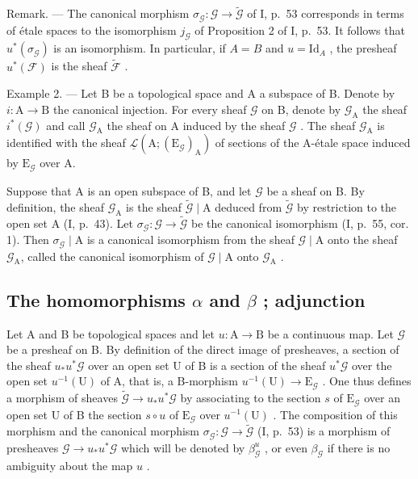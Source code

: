 Remark. --- The canonical morphism \(\sigma_{\mathcal{G}}\colon\mathcal{G}\to\widetilde{\mathcal{G}}\) of I, p.~53 corresponds in terms of étale spaces to the isomorphism \(j_{\mathcal{G}}\) of Proposition 2 of I, p.~53. It follows that \(u^{*}(\sigma_{\mathcal{G}})\) is an isomorphism. In particular, if \(A = B\) and \(u = \mathrm{Id}_A\) , the presheaf \(u^{*}(\mathcal{F})\) is the sheaf \(\widetilde{\mathcal{F}}\) .

Example 2. --- Let B be a topological space and A a subspace of B. Denote by \(i\colon\mathrm{A}\to\mathrm{B}\) the canonical injection. For every sheaf \(\mathcal{G}\) on B, denote by \(\mathcal{G}_{\mathrm{A}}\) the sheaf \(i^{*}(\mathcal{G})\) and call \(\mathcal{G}_{\mathrm{A}}\) the sheaf on A induced by the sheaf \(\mathcal{G}\) . The sheaf \(\mathcal{G}_{\mathrm{A}}\) is identified with the sheaf \(\underline{\mathcal{L}}(\mathrm{A};(\mathrm{E}_{\mathcal{G}})_{\mathrm{A}})\) of sections of the A-étale space induced by \(\mathrm{E}_{\mathcal{G}}\) over A.

Suppose that A is an open subspace of B, and let \(\mathcal{G}\) be a sheaf on B. By definition, the sheaf \(\mathcal{G}_{\mathrm{A}}\) is the sheaf \(\widetilde{\mathcal{G}}\mid \mathrm{A}\) deduced from \(\widetilde{\mathcal{G}}\) by restriction to the open set A (I, p.~43). Let \(\sigma_{\mathcal{G}}\colon \mathcal{G}\to \widetilde{\mathcal{G}}\) be the canonical isomorphism (I, p.~55, cor. 1). Then \(\sigma_{\mathcal{G}}\mid \mathrm{A}\) is a canonical isomorphism from the sheaf \(\mathcal{G}\mid \mathrm{A}\) onto the sheaf \(\mathcal{G}_{\mathrm{A}}\), called the canonical isomorphism of \(\mathcal{G}\mid \mathrm{A}\) onto \(\mathcal{G}_{\mathrm{A}}\) .

\subsection{\texorpdfstring{The homomorphisms \(\alpha\) and \(\beta\) ; adjunction}{The homomorphisms alpha and beta ; adjunction}}

Let A and B be topological spaces and let \(u\colon\mathrm{A}\to\mathrm{B}\) be a continuous map. Let \(\mathcal{G}\) be a presheaf on B. By definition of the direct image of presheaves, a section of the sheaf \(u_{*}u^{*}\mathcal{G}\) over an open set U of B is a section of the sheaf \(u^{*}\mathcal{G}\) over the open set \(u^{-1}(\mathrm{U})\) of A, that is, a B-morphism \(u^{-1}(\mathrm{U})\to\mathrm{E}_{\mathcal{G}}\) . One thus defines a morphism of sheaves \(\widetilde{\mathcal{G}}\to u_{*}u^{*}\mathcal{G}\) by associating to the section \(s\) of \(\mathrm{E}_{\mathcal{G}}\) over an open set U of B the section \(s\circ u\) of \(\mathrm{E}_{\mathcal{G}}\) over \(u^{-1}(\mathrm{U})\) . The composition of this morphism and the canonical morphism \(\sigma_{\mathcal{G}}\colon\mathcal{G}\to\widetilde{\mathcal{G}}\) (I, p.~53) is a morphism of presheaves \(\mathcal{G}\to u_{*}u^{*}\mathcal{G}\) which will be denoted by \(\beta_{\mathcal{G}}^{u}\) , or even \(\beta_{\mathcal{G}}\) if there is no ambiguity about the map \(u\) .

